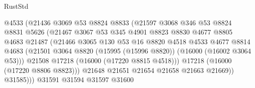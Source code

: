 \begin{lexlean}{RustStd}
\begin{coremodule}
                                  @4533
                                  (@21436
                                    @3069
                                    @53
                                    @8824
                                    @8833
                                    (@21597
                                      @3068
                                      @346
                                      @53
                                      @8824
                                      @8831
                                      @5626
                                      (@21467
                                        @3067
                                        @53
                                        @345
                                        @4901
                                        @8823
                                        @8830
                                        @4677
                                        @8805
                                        @4683
                                        @21487
                                        (@21466
                                          @3065
                                          @130
                                          @53
                                          @16
                                          @8820
                                          @4518
                                          @4533
                                          @4677
                                          @8814
                                          @4683
                                          (@21501
                                            @3064
                                            @8820
                                            (@15995 (@15996 @8820))
                                            (@16000 (@16002 @3064 @53)))
                                          @21508
                                          @17218
                                          (@16000 (@17220 @8815 @4518)))
                                        @17218
                                        (@16000 (@17220 @8806 @8823)))
                                      @21648
                                      @21651
                                      @21654
                                      @21658
                                      @21663
                                      @21669))
                                  @31585)))
                            @31591
                            @31594
                            @31597
                            @31600

\end{coremodule}
\end{lexlean}
